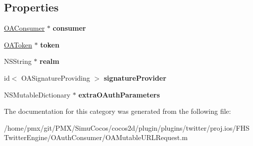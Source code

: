 \subsection*{Properties}
\begin{DoxyCompactItemize}
\item 
\mbox{\label{categoryOAMutableURLRequest_07_08_a2e6f6cfcb9d07eb310c6ead677faffe3}} 
\hyperlink{interfaceOAConsumer}{O\+A\+Consumer} $\ast$ {\bfseries consumer}
\item 
\mbox{\label{categoryOAMutableURLRequest_07_08_ad5d0d13989ac8d318b27df2936ae3ae3}} 
\hyperlink{interfaceOAToken}{O\+A\+Token} $\ast$ {\bfseries token}
\item 
\mbox{\label{categoryOAMutableURLRequest_07_08_acf30590342491256eb91e78a2801442a}} 
N\+S\+String $\ast$ {\bfseries realm}
\item 
\mbox{\label{categoryOAMutableURLRequest_07_08_aaca676a037010402b33b45c53e926d18}} 
id$<$ O\+A\+Signature\+Providing $>$ {\bfseries signature\+Provider}
\item 
\mbox{\label{categoryOAMutableURLRequest_07_08_add52ec733dc469c2a4858fc8b9d451e3}} 
N\+S\+Mutable\+Dictionary $\ast$ {\bfseries extra\+O\+Auth\+Parameters}
\end{DoxyCompactItemize}


The documentation for this category was generated from the following file\+:\begin{DoxyCompactItemize}
\item 
/home/pmx/git/\+P\+M\+X/\+Simu\+Cocos/cocos2d/plugin/plugins/twitter/proj.\+ios/\+F\+H\+S\+Twitter\+Engine/\+O\+Auth\+Consumer/O\+A\+Mutable\+U\+R\+L\+Request.\+m\end{DoxyCompactItemize}
